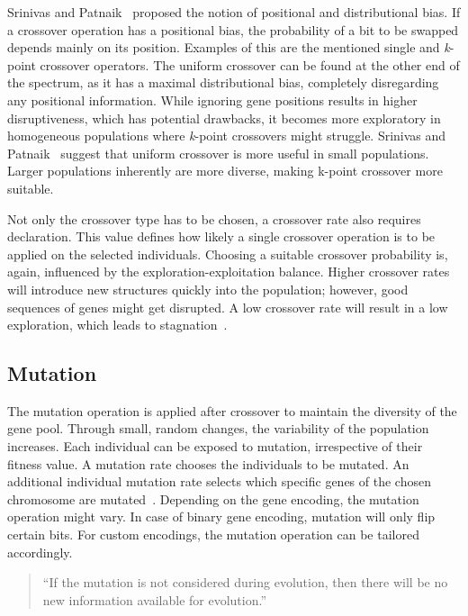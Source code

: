 Srinivas and Patnaik~\cite{srinivas_genetic_1994} proposed the notion of positional and distributional bias. If a crossover operation has a positional bias, the probability of a bit to be swapped depends mainly on its position. Examples of this are the mentioned single and \textit{k}-point crossover operators. The uniform crossover can be found at the other end of the spectrum, as it has a maximal distributional bias, completely disregarding any positional information. While ignoring gene positions results in higher disruptiveness, which has potential drawbacks, it becomes more exploratory in homogeneous populations where \textit{k}-point crossovers might struggle. Srinivas and Patnaik~\cite{srinivas_genetic_1994} suggest that uniform crossover is more useful in small populations. Larger populations inherently are more diverse, making k-point crossover more suitable.

Not only the crossover type has to be chosen, a crossover rate also requires declaration. This value defines how likely a single crossover operation is to be applied on the selected individuals. Choosing a suitable crossover probability is, again, influenced by the exploration-exploitation balance. Higher crossover rates will introduce new structures quickly into the population; however, good sequences of genes might get disrupted. A low crossover rate will result in a low exploration, which leads to stagnation~\cite{grefenstette_optimization_1986}.

\subsection{Mutation}
The mutation operation is applied after crossover to maintain the diversity of the gene pool. Through small, random changes, the variability of the population increases. Each individual can be exposed to mutation, irrespective of their fitness value. A mutation rate chooses the individuals to be mutated. An additional individual mutation rate selects which specific genes of the chosen chromosome are mutated~\cite{srinivas_genetic_1994}. Depending on the gene encoding, the mutation operation might vary. In case of binary gene encoding, mutation will only flip certain bits. For custom encodings, the mutation operation can be tailored accordingly.

\begin{quote}
	\begin{em}
		\enquote{If the mutation is not considered during evolution, then there will be no new information available for evolution.}~\cite{katoch_review_2021}
	\end{em}
\end{quote}

